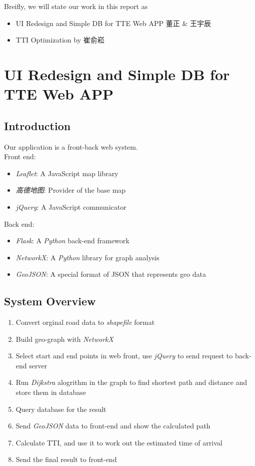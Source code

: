 \documentclass[fontset=none]{ctexart}
\theoremstyle{definition}
\theoremstyle{remark}
\begin{document}
Breifly, we will state our work in this report as
\begin{itemize}
  \item UI Redesign and Simple DB for TTE Web APP 董正 \& 王宇辰
  \item TTI Optimization by 崔俞崧
\end{itemize}

\section{UI Redesign and Simple DB for TTE Web APP}
\subsection{Introduction}
Our application is a front-back web system.
~\\

Front end:
\begin{itemize}
  \item \textit{Leaflet}: A JavaScript map library
  \item \textit{高德地图}: Provider of the base map
  \item \textit{jQuery}: A JavaScript communicator
\end{itemize}

Back end:
\begin{itemize}
  \item \textit{Flask}: A \textit{Python} back-end framework
  \item \textit{NetworkX}: A \textit{Python} library for graph analysis
  \item \textit{GeoJSON}: A special format of JSON that represents geo data
\end{itemize}

\subsection{System Overview}
\begin{enumerate}
  \item Convert orginal road data to \textit{shapefile} format
  \item Build geo-graph with \textit{NetworkX}
  \item Select start and end points in web front, use \textit{jQuery} to send request to back-end server
  \item Run \textit{Dijkstra} alogrithm in the graph to find shortest path and distance and store them in database
  \item Query database for the result
  \item Send \textit{GeoJSON} data to front-end and show the calculated path
  \item Calculate TTI, and use it to work out the estimated time of arrival
  \item Send the final result to front-end
\end{enumerate}
\end{document}
